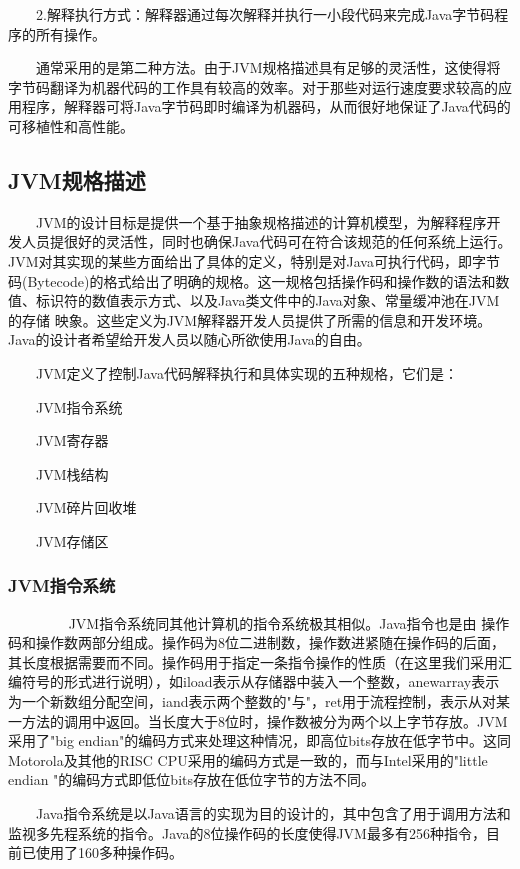 \documentclass[10pt,b5paper]{article}
\begin{document}
　　2.解释执行方式：解释器通过每次解释并执行一小段代码来完成Java字节码程 序的所有操作。 

　　通常采用的是第二种方法。由于JVM规格描述具有足够的灵活性，这使得将字节码翻译为机器代码的工作具有较高的效率。对于那些对运行速度要求较高的应用程序，解释器可将Java字节码即时编译为机器码，从而很好地保证了Java代码的可移植性和高性能。 
　　 

\subsection{JVM规格描述}
\label{sec-1-2}
　　JVM的设计目标是提供一个基于抽象规格描述的计算机模型，为解释程序开发人员提很好的灵活性，同时也确保Java代码可在符合该规范的任何系统上运行。JVM对其实现的某些方面给出了具体的定义，特别是对Java可执行代码，即字节码(Bytecode)的格式给出了明确的规格。这一规格包括操作码和操作数的语法和数值、标识符的数值表示方式、以及Java类文件中的Java对象、常量缓冲池在JVM的存储 映象。这些定义为JVM解释器开发人员提供了所需的信息和开发环境。Java的设计者希望给开发人员以随心所欲使用Java的自由。 

　　JVM定义了控制Java代码解释执行和具体实现的五种规格，它们是： 

　　JVM指令系统 

　　JVM寄存器 

　　JVM栈结构 

　　JVM碎片回收堆 

　　JVM存储区 

\subsubsection{JVM指令系统}
\label{sec-1-2-1}
　　 
　　JVM指令系统同其他计算机的指令系统极其相似。Java指令也是由 操作码和操作数两部分组成。操作码为8位二进制数，操作数进紧随在操作码的后面，其长度根据需要而不同。操作码用于指定一条指令操作的性质（在这里我们采用汇编符号的形式进行说明），如iload表示从存储器中装入一个整数，anewarray表示为一个新数组分配空间，iand表示两个整数的"与"，ret用于流程控制，表示从对某一方法的调用中返回。当长度大于8位时，操作数被分为两个以上字节存放。JVM采用了"big endian"的编码方式来处理这种情况，即高位bits存放在低字节中。这同 Motorola及其他的RISC CPU采用的编码方式是一致的，而与Intel采用的"little endian "的编码方式即低位bits存放在低位字节的方法不同。 

　　Java指令系统是以Java语言的实现为目的设计的，其中包含了用于调用方法和监视多先程系统的指令。Java的8位操作码的长度使得JVM最多有256种指令，目前已使用了160多种操作码。 
　　 
\end{document}
